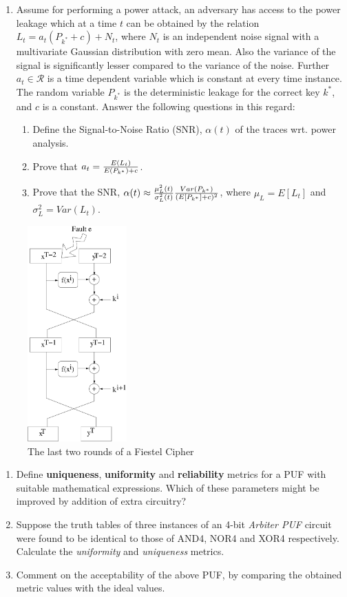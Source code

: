 \documentclass{article}
\begin{document}
\begin{questions}
\begin{enumerate}
\item Assume for performing a power attack, an adversary has access to the  power leakage which at a time $t$ can be obtained by the relation 
$L_t=a_t(P_{k^*}+ c) + N_t$, where $N_t$ is an independent noise signal with a multivariate Gaussian distribution with zero mean. Also the variance of the signal is significantly lesser compared to the variance of the noise. Further $a_t \in \mathcal{R}$ is a time dependent variable which is constant at every time instance. The random variable $P_{k^*}$ is the deterministic leakage for the correct key $k^*$, and $c$ is a constant. Answer the following questions in this regard:
\begin{enumerate}
\item Define the Signal-to-Noise Ratio (SNR), $\alpha(t)$ of the traces wrt. power analysis.
\item Prove that $a_t={E(L_t) \over {E(P_{k^*})+c}}$. 
\item Prove that the SNR, $\alpha(t)\approx {\mu^2_L(t) \over \sigma^2_L(t)}{Var(P_{k^*}) \over (E[P_{k^*}]+c)^2}$, where $\mu_L=E[L_t]$ and $\sigma^2_L=Var(L_t)$.
\end{enumerate}
\end{enumerate}


\begin{figure}[h]
\centering
\includegraphics[width=1.5in]{DES}
\caption{The last two rounds of a Fiestel Cipher}
\label{DES}
\end{figure}


\question
\begin{enumerate}
\item Define \textbf{uniqueness}, \textbf{uniformity} and \textbf{reliability}
metrics for a  PUF with suitable mathematical expressions. Which of these
parameters might be improved by addition of extra circuitry? 
\item Suppose the truth tables of three instances of an 4-bit \emph{Arbiter PUF} 
circuit were found to be identical to those of AND4, NOR4 and XOR4 respectively.
Calculate the \emph{uniformity} and \emph{uniqueness} metrics. 
\item Comment on the acceptability of the above PUF, by comparing the obtained
metric values with the ideal values. 
\end{enumerate}


\end{questions}
\end{document}
